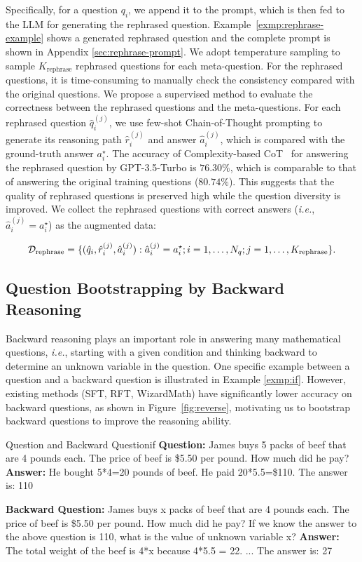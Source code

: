 Specifically, for a question $q_i$, we append it to the prompt, which is then fed to the LLM for generating the rephrased question. Example~\ref{exmp:rephrase-example} shows a generated rephrased question and the complete prompt is shown in Appendix \ref{sec:rephrase-prompt}. We adopt temperature sampling to sample $K_{\text{rephrase}}$ rephrased questions for each meta-question. For the rephrased questions, it is time-consuming to manually check the consistency compared with the original questions. We propose a supervised method to evaluate the correctness between the rephrased questions and the meta-questions. For each rephrased question $\hat{q}_i^{(j)}$, we use few-shot Chain-of-Thought prompting to generate its reasoning path $\hat{r}_i^{(j)}$ and answer $\hat{a}_i^{(j)}$, which is compared with the ground-truth answer $a_i^\star$. The accuracy of Complexity-based CoT~\citep{fu2023complexitybased} for answering the rephrased question by GPT-3.5-Turbo is $76.30\%$, which is comparable to that of answering the original training questions ($80.74\%$). This suggests that the quality of rephrased questions is preserved high while the question diversity is improved. We collect the rephrased questions with correct answers (\emph{i.e.}, $\hat{a}_i^{(j)} = a_i^\star$) as the augmented data:

\begin{equation}
\small
\mathcal{D}_{\text{rephrase}} = \{(\hat{q}_i, \hat{r}_i^{(j)}, \hat{a}_i^{(j)}): \hat{a}_i^{(j)} = a_i^\star;  i=1,\dots, N_q; j=1,\dots, K_{\text{rephrase}}\}.
\end{equation}

\subsection{Question Bootstrapping by Backward Reasoning}

Backward reasoning plays an important role in answering many mathematical questions, \emph{i.e.}, starting with a given condition and thinking backward to determine an unknown variable in the question. One specific example between a question and a backward question is illustrated in Example \ref{exmp:if}. 
However, existing methods (SFT, RFT, WizardMath) have significantly lower accuracy on backward questions, as shown in Figure~\ref{fig:reverse}, motivating us to bootstrap backward questions to improve the reasoning ability.

\begin{exmp}{Question and Backward Question}{if}
    \small
    \textbf{Question:}
    James buys 5 packs of beef that are 4 pounds each. The price of beef is \$5.50 per pound. How much did he pay? \textbf{Answer:} He bought 5*4=20 pounds of beef. He paid 20*5.5=\$110. The answer is: 110 \textcolor{red}{{}}

    \textbf{Backward Question:} James buys x packs of beef that are 4 pounds each. The price of beef is \$5.50 per pound. How much did he pay? If we know the answer to the above question is 110, what is the value of unknown variable x? \textbf{Answer:} The total weight of the beef is 4*x because 4*5.5 = 22. ...  The answer is: 27 \textcolor{red}{}
\end{exmp}

